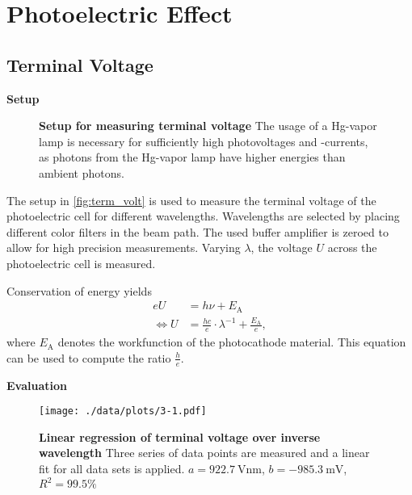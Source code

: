 \chapter{Photoelectric Effect}


\section{Terminal Voltage}%

\textbf{Setup}\\
\begin{figure}[tbp]
	\centering
	\caption[Setup for measuring terminal voltage]{\textbf{Setup for measuring terminal voltage} The usage of a Hg-vapor lamp is necessary for sufficiently high photovoltages and -currents, as photons from the Hg-vapor lamp have higher energies than ambient photons.}
	\label{fig:term_volt}
\end{figure}
The setup in \autoref{fig:term_volt} is used to measure the terminal voltage of the photoelectric cell for different wavelengths.
Wavelengths are selected by placing different color filters in the beam path.
The used buffer amplifier is zeroed to allow for high precision measurements.
Varying $\lambda$, the voltage $U$ across the photoelectric cell is measured.

Conservation of energy yields
\begin{align}
	eU &= h\nu+E_\text{A} \nonumber \\
	\Leftrightarrow U &= \frac{hc}{e}\cdot\lambda^{-1}+\frac{E_\text{A}}{e}, \label{eq:energy_balance}
\end{align}
where $E_\text{A}$ denotes the workfunction of the photocathode material.
This equation can be used to compute the ratio $\frac{h}{e}$.

\textbf{Evaluation}\\
\begin{figure}[tbp]
	\centering
	\texttt{[image: ./data/plots/3-1.pdf]}
	\caption[Linear regression of terminal voltage over inverse wavelength]{\textbf{Linear regression of terminal voltage over inverse wavelength} Three series of data points are measured and a linear fit for all data sets is applied. $a=\SI{922.7}{\volt\nm}$, $b=\SI{-985.3}{\milli\V}$, $R^2=99.5\%$}
	\label{fig:linreg_term_volt}
\end{figure}


